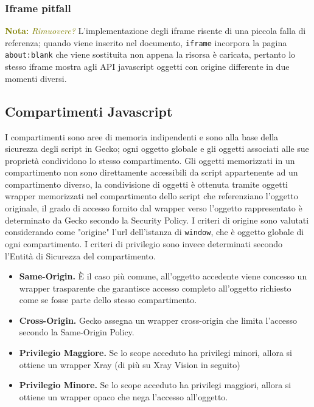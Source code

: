 \documentclass{sapthesis}
\newcommand{\MComment}[3]{\textcolor{#3}{ \textbf{#1} \textit{#2}}}
\newcommand{\Nota}[1]{\MComment{Nota:}{#1}{olive}}
\newcommand{\code}[1]{\texttt{#1}}
\begin{document}
            \subsubsection{Iframe pitfall}
            \Nota{Rimuovere?}
                L'implementazione degli iframe risente di una piccola falla di referenza; quando viene inserito
                nel documento, \code{iframe} incorpora la pagina \code{about:blank} che viene sostituita non
                appena la risorsa è caricata, pertanto lo stesso iframe mostra agli API javascript oggetti con
                origine differente in due momenti diversi.


        \subsection{Compartimenti Javascript}
            I compartimenti sono aree di memoria indipendenti e sono alla base della sicurezza degli script
            in Gecko; ogni oggetto globale e gli oggetti associati alle sue proprietà condividono lo stesso
            compartimento. Gli oggetti memorizzati in un compartimento non sono direttamente accessibili da 
            script appartenente ad un compartimento diverso, la condivisione di oggetti è ottenuta tramite
            oggetti wrapper memorizzati nel compartimento dello script che referenziano l'oggetto originale,
            il grado di accesso fornito dal wrapper verso l'oggetto rappresentato è determinato da Gecko
            secondo la Security Policy.
            I criteri di origine sono valutati considerando come "origine" l'url dell'istanza di \code{window}, 
            che è oggetto globale di ogni compartimento. I criteri di privilegio sono invece determinati
            secondo l'Entità di Sicurezza del compartimento.
            \begin{itemize}
                \item \textbf{Same-Origin.} È il caso più comune, all'oggetto accedente viene concesso un
                    wrapper trasparente che garantisce accesso completo all'oggetto richiesto come se 
                    fosse parte dello stesso compartimento. 

                \item \textbf{Cross-Origin.} Gecko assegna un wrapper cross-origin che limita l'accesso 
                    secondo la Same-Origin Policy.

                \item \textbf{Privilegio Maggiore.} Se lo scope acceduto ha privilegi minori, allora si
                    ottiene un wrapper Xray (di più su Xray Vision in seguito)

                \item \textbf{Privilegio Minore.} Se lo scope acceduto ha privilegi maggiori, allora si
                    ottiene un wrapper opaco che nega l'accesso all'oggetto.
            \end{itemize}
\end{document}
